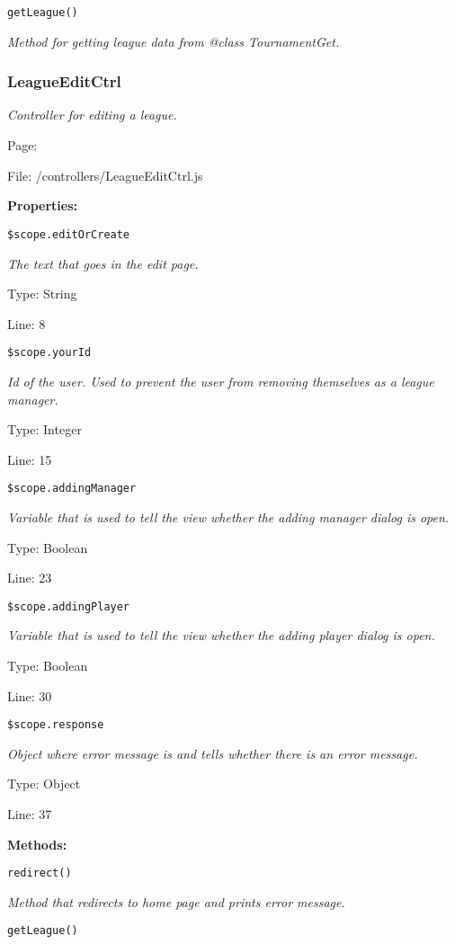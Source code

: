 \texttt{getLeague()}

{\scriptsize
\textit{Method for getting league data from @class TournamentGet.}

}

\subsubsection{LeagueEditCtrl}\label{LeagueEditCtrl.js.doc}
\textit{Controller for editing a league.}

Page: \pageref{LeagueEditCtrl.js}

File: /controllers/LeagueEditCtrl.js

\textbf{Properties:}

\texttt{\$scope.editOrCreate}

{\scriptsize
\textit{The text that goes in the edit page.}

Type: String

Line: 8

}
\texttt{\$scope.yourId}

{\scriptsize
\textit{Id of the user.
Used to prevent the user from removing themselves as a league manager.}

Type: Integer

Line: 15

}
\texttt{\$scope.addingManager}

{\scriptsize
\textit{Variable that is used to tell the view whether the adding manager dialog is open.}

Type: Boolean

Line: 23

}
\texttt{\$scope.addingPlayer}

{\scriptsize
\textit{Variable that is used to tell the view whether the adding player dialog is open.}

Type: Boolean

Line: 30

}
\texttt{\$scope.response}

{\scriptsize
\textit{Object where error message is and tells whether there is an error message.}

Type: Object

Line: 37

}
\textbf{Methods:}

\texttt{redirect()}

{\scriptsize
\textit{Method that redirects to home page and prints error message.}

}

\texttt{getLeague()}

